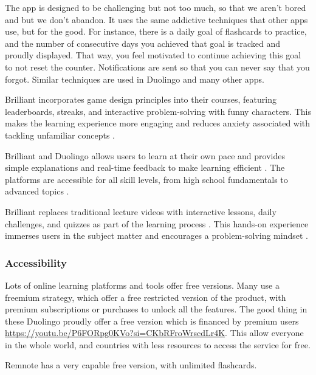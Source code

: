 \documentclass{article}
\begin{document}
The app is designed to be challenging but not too much, so that we aren't bored and but we don't abandon. It uses the same addictive techniques that other apps use, but for the good. For instance, there is a daily goal of flashcards to practice, and the number of consecutive days you achieved that goal is tracked and proudly displayed. That way, you feel motivated to continue achieving this goal to not reset the counter. Notifications are sent so that you can never say that you forgot.  Similar techniques are used in Duolingo and many other apps.

Brilliant incorporates game design principles into their courses, featuring leaderboards, streaks, and interactive problem-solving with funny characters. This makes the learning experience more engaging and reduces anxiety associated with tackling unfamiliar concepts \cite{https://fordhamram.com/2023/04/11/the-complete-brilliant.org-review}.

Brilliant and Duolingo allows users to learn at their own pace and provides simple explanations and real-time feedback to make learning efficient \cite{https://fordhamram.com/2023/04/11/the-complete-brilliant.org-review}. The platforms are accessible for all skill levels, from high school fundamentals to advanced topics \cite{https://fordhamram.com/2023/04/11/the-complete-brilliant.org-review}.

Brilliant replaces traditional lecture videos with interactive lessons, daily challenges, and quizzes as part of the learning process \cite{https://fordhamram.com/2023/04/11/the-complete-brilliant.org-review}. This hands-on experience immerses users in the subject matter and encourages a problem-solving mindset \cite{https://edwize.org/brilliant-org-review/}.

\subsubsection{Accessibility}
Lots of online learning platforms and tools offer free versions. Many use a freemium strategy, which offer a free restricted version of the product, with premium subscriptions or purchases to unlock all the features. The good thing in these Duolingo proudly offer a free version which is financed by premium users \url{https://youtu.be/P6FORpg0KVo?si=CKbRFroWrscdLr4K}. This allow everyone in the whole world, and countries with less resources to access the service for free.

Remnote has a very capable free version, with unlimited flashcards.
\end{document}

